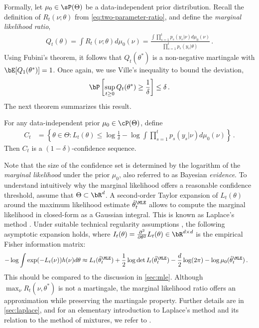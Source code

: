 Formally, let $\mu_0 \in \sP(\Theta)$ be a data-independent prior distribution. Recall the definition of $R_t(\nu;\theta)$ from \cref{eq:two-parameter-ratio}, and define the \emph{marginal likelihood ratio},
\begin{align*}
    Q_t(\theta) = \int R_t(\nu; \theta) d\mu_0(\nu) =  \frac{ \int \prod_{s=1}^t p_s(y_s|\nu)  d\mu_0(\nu)}{\prod_{s=1}^t p_s(y_s|\theta)} \,.
\end{align*}
Using Fubini's theorem, it follows that $Q_t(\theta^*)$ is a non-negative martingale with $\bE[Q_1(\theta^*)]=1$. Once again, we use Ville's inequality to bound the deviation,
\begin{align*}
    \bP\left[\sup_{t \geq 0} Q_t(\theta^*) \geq \frac{1}{\delta}\right] \leq \delta \,.
\end{align*}
The next theorem summarizes this result.
\begin{theorem}\label{result:prior_mixing}
    For any data-independent prior $\mu_0 \in \cP(\Theta)$, define
    \begin{align*}
        C_t &= \left\{ \theta \in \Theta: L_t(\theta) \leq  \log \frac{1}{\delta} - \log \int \prod_{s=1}^t p_s(y_s|\nu) d\mu_0(\nu) \right\} \,.
    \end{align*}
Then $C_t$ is a $(1-\delta)$-confidence sequence.
\end{theorem}
Note that the size of the confidence set is determined by the logarithm of the \emph{marginal likelihood} under the prior $\mu_0$, also referred to as Bayesian \emph{evidence}. To understand intuitively why the marginal likelihood offers a reasonable confidence threshold, assume that $\Theta \subset \bR^d$. A second-order Taylor expansion of $L_t(\theta)$ around the maximum likelihood estimate $\hat \theta_t^\MLE$ allows to compute the marginal likelihood in closed-form as a Gaussian integral. This is known as Laplace's method \citep{laplace1774memoire}. Under suitable technical regularity assumptions \citep[e.g.,][]{shun1995laplace}, the following asymptotic expansion holds,  
where $I_t(\theta) = \frac{\partial^2}{\partial \theta^2} L_t(\theta) \in \bR^{d\times d}$ is the empirical Fisher information matrix:
\begin{align*}
    - \log \int \exp(-L_t(\nu))  h(\nu) d\theta
    &\approx L_t(\hat \theta_t^{\MLE})  + \frac{1}{2}\log \det I_t(\hat \theta_t^\MLE) - \frac{d}{2} \log(2\pi) - \log \mu_0(\hat \theta_t^\MLE)  \,.
\end{align*}
This should be compared to the discussion in \cref{sec:mle}. Although $\max_{\nu} R_t(\nu,\theta^*)$ is not a martingale, the marginal likelihood ratio offers an approximation while preserving the martingale property. Further details are in \cref{sec:laplace}, and for an elementary introduction to Laplace's method and its relation to the method of mixtures, we refer to \citet[Chapter 20]{lattimore2020bandit}.


